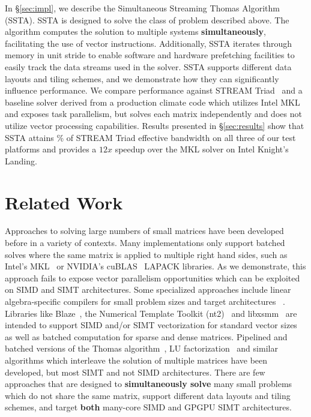 \documentclass{sig-alternate}
\newcommand{\textapprox}{\texttildelow}
\begin{document}
In \S\ref{sec:impl}, we describe the Simultaneous Streaming Thomas
  Algorithm (SSTA).
SSTA is designed to solve the class of problem described above.
The algorithm computes the solution to multiple systems \textbf{simultaneously},
  facilitating the use of vector instructions.
Additionally, SSTA iterates through memory in unit stride to enable software and 
  hardware prefetching facilities to easily track the data streams used in the
  solver.
SSTA supports different data layouts and tiling schemes, and we demonstrate how
  they can significantly influence performance.
We compare performance against STREAM Triad~\cite{stream} and a baseline solver
  derived from a production climate code which utilizes Intel MKL and exposes
  task parallelism, but solves each matrix independently and does not utilize
  vector processing capabilities.
Results presented in \S\ref{sec:results} show that SSTA attains \textapprox 90\%
  of STREAM Triad effective bandwidth on all three of our test platforms and
  provides a \textapprox \(12x\) speedup over the MKL solver on Intel Knight's
  Landing.

\section{Related Work}
\label{sec:related}

Approaches to solving large numbers of small matrices have been 
  developed before in a variety of contexts.
Many implementations only support batched solves where the same matrix is
  applied to multiple right hand sides, such as Intel's MKL~\cite{mkl} or
  NVIDIA's cuBLAS~\cite{cublas} LAPACK libraries.
As we demonstrate, this approach fails to expose vector parallelism
  opportunities which can be exploited on SIMD and SIMT architectures.
Some specialized approaches include linear algebra-specific 
  compilers for small problem sizes and target architectures 
  ~\cite{bto_compiler, lgen}.
Libraries like Blaze~\cite{blaze_git}, the Numerical Template Toolkit
  (nt2)~\cite{nt2_git} and libxsmm~\cite{libxsmm_git} are intended to support
  SIMD and/or SIMT vectorization for standard vector sizes as well as batched
  computation for sparse and dense matrices.
Pipelined and batched versions of the Thomas
  algorithm~\cite{pipelined_thomas_algorithm}, LU
  factorization~\cite{batched_lu_haidar} and similar algorithms which 
  interleave the solution of multiple matrices have been developed, but most
  SIMT and not SIMD architectures.
There are few approaches that are designed to \textbf{simultaneously solve}
  many small problems which do not share the same matrix, support different
  data layouts and tiling schemes, and target \textbf{both} many-core SIMD and
  GPGPU SIMT architectures.
\end{document}
